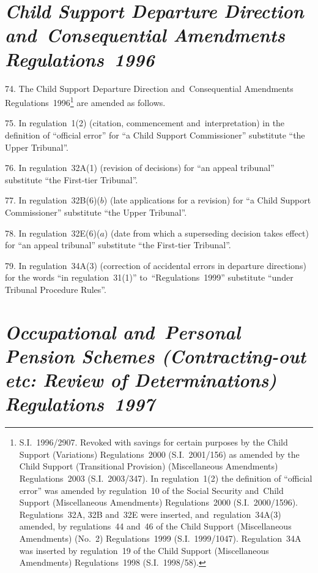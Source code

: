 \documentclass[12pt,a4paper]{article}
\begin{document}
\section*{\itshape Child Support Departure Direction and~Consequential Amendments Regulations~1996}

74.  The Child Support Departure Direction and~Consequential Amendments Regulations~1996\footnote{S.I.~1996/2907. Revoked with savings for certain purposes by the Child Support (Variations) Regulations~2000 (S.I.~2001/156) as amended by the Child Support (Transitional Provision) (Miscellaneous Amendments) Regulations~2003 (S.I.~2003/347). In regulation~1(2) the definition of “official error” was amended by regulation~10 of the Social Security and~Child Support (Miscellaneous Amendments) Regulations~2000 (S.I.~2000/1596). Regulations~32A, 32B and~32E were inserted, and~regulation~34A(3) amended, by regulations~44 and~46 of the Child Support (Miscellaneous Amendments) (No.~2) Regulations~1999 (S.I.~1999/1047). Regulation~34A was inserted by regulation~19 of the Child Support (Miscellaneous Amendments) Regulations~1998 (S.I.~1998/58).} are amended as follows.

\medskip

75.  In regulation~1(2) (citation, commencement and~interpretation) in the definition of “official error” for “a Child Support Commissioner” substitute “the Upper Tribunal”.

\medskip

76.  In regulation~32A(1) (revision of decisions) for “an appeal tribunal” substitute “the First-tier Tribunal”.

\medskip

77.  In regulation~32B(6)($b$)  (late applications for a revision) for “a Child Support Commissioner” substitute “the Upper Tribunal”.

\medskip

78.  In regulation~32E(6)($a$)  (date from which a superseding decision takes effect) for “an appeal tribunal” substitute “the First-tier Tribunal”.

\medskip

79.  In regulation~34A(3) (correction of accidental errors in departure directions) for the words “in regulation~31(1)” to~“Regulations~1999” substitute “under Tribunal Procedure Rules”.

\section*{\itshape Occupational and~Personal Pension Schemes (Contracting-out etc: Review of Determinations) Regulations~1997}
\end{document}

